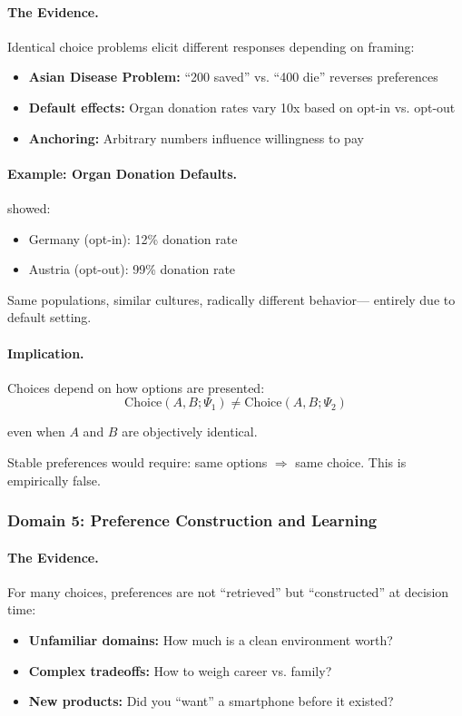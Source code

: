 \paragraph{The Evidence.}
Identical choice problems elicit different responses depending on framing:
\begin{itemize}
  \item \textbf{Asian Disease Problem:} ``200 saved'' vs. ``400 die'' reverses preferences \citep{tverskykahneman1981}
  \item \textbf{Default effects:} Organ donation rates vary 10x based on opt-in vs. opt-out
  \item \textbf{Anchoring:} Arbitrary numbers influence willingness to pay
\end{itemize}

\paragraph{Example: Organ Donation Defaults.}
\citet{johnsonetal2003} showed:
\begin{itemize}
  \item Germany (opt-in): 12\% donation rate
  \item Austria (opt-out): 99\% donation rate
\end{itemize}

Same populations, similar cultures, radically different behavior---
entirely due to default setting.

\paragraph{Implication.}
Choices depend on how options are presented:
\begin{equation}
  \text{Choice}(A, B; \Psi_1) \neq \text{Choice}(A, B; \Psi_2)
\end{equation}

even when $A$ and $B$ are objectively identical.

Stable preferences would require: same options $\Rightarrow$ same choice.
This is empirically false.

\subsubsection{Domain 5: Preference Construction and Learning}

\paragraph{The Evidence.}
For many choices, preferences are not ``retrieved'' but ``constructed'' at decision time:
\begin{itemize}
  \item \textbf{Unfamiliar domains:} How much is a clean environment worth?
  \item \textbf{Complex tradeoffs:} How to weigh career vs. family?
  \item \textbf{New products:} Did you ``want'' a smartphone before it existed?
\end{itemize}

